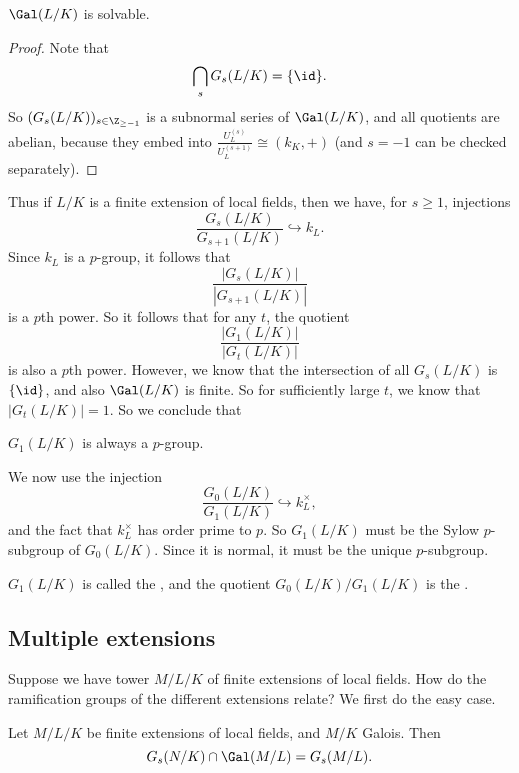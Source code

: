 \documentclass[a4paper]{article}
\begin{document}
\begin{cor}
  $\Gal(L/K)$ is solvable.
\end{cor}

\begin{proof}
  Note that
  \[
    \bigcap_s G_s(L/K) = \{\id\}.
  \]
  So $(G_s(L/K))_{s \in \Z_{\geq -1}}$ is a subnormal series of $\Gal(L/K)$, and all quotients are abelian, because they embed into $\frac{U_L^{(s)}}{U_L^{(s + 1)}} \cong (k_K, +)$ (and $s = -1$ can be checked separately).
\end{proof}

Thus if $L/K$ is a finite extension of local fields, then we have, for $s \geq 1$, injections
\[
  \frac{G_s(L/K)}{G_{s + 1}(L/K)} \hookrightarrow k_L.
\]
Since $k_L$ is a $p$-group, it follows that
\[
  \frac{|G_s(L/K)|}{|G_{s + 1}(L/K)|}
\]
is a $p$th power. So it follows that for any $t$, the quotient
\[
  \frac{|G_1(L/K)|}{|G_t(L/K)|}
\]
is also a $p$th power. However, we know that the intersection of all $G_s(L/K)$ is $\{\id\}$, and also $\Gal(L/K)$ is finite. So for sufficiently large $t$, we know that $|G_t(L/K)| = 1$. So we conclude that
\begin{prop}
  $G_1(L/K)$ is always a $p$-group.
\end{prop}

We now use the injection
\[
  \frac{G_0(L/K)}{G_1(L/K)} \hookrightarrow k_L^\times,
\]
and the fact that $k_L^\times$ has order prime to $p$. So $G_1(L/K)$ must be the Sylow $p$-subgroup of $G_0(L/K)$. Since it is normal, it must be the unique $p$-subgroup.

\begin{defi}
  $G_1(L/K)$ is called the , and the quotient $G_0(L/K)/G_1(L/K)$ is the .
\end{defi}

\subsection{Multiple extensions}
Suppose we have tower $M/L/K$ of finite extensions of local fields. How do the ramification groups of the different extensions relate? We first do the easy case.

\begin{prop}
  Let $M/L/K$ be finite extensions of local fields, and $M/K$ Galois. Then
  \[
    G_s(N/K) \cap \Gal(M/L) = G_s(M/L).
  \]
\end{prop}
\end{document}
